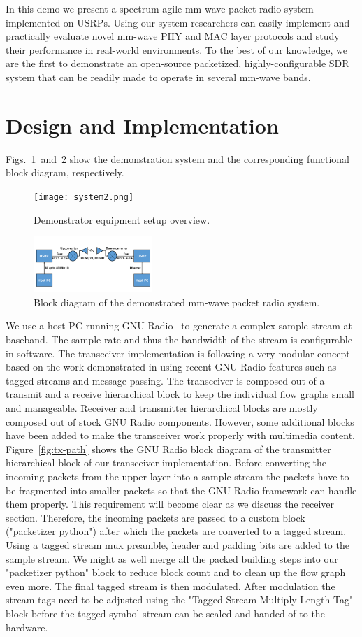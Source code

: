 \documentclass{sig-alternate}
\begin{document}
In this demo we present a spectrum-agile mm-wave packet radio system implemented on USRPs. Using our system researchers can easily implement and practically evaluate novel mm-wave PHY and MAC layer protocols and study their performance in real-world environments. To the best of our knowledge, we are the first to demonstrate an open-source packetized, highly-configurable SDR system that can be readily made to operate in several mm-wave bands.

\section{Design and Implementation}
Figs.~\ref{fig:system}~and~\ref{fig:block} show the demonstration system and the corresponding functional block diagram, respectively.
\begin{figure}[!tb]
\center
\texttt{[image: system2.png]}
\caption{Demonstrator equipment setup overview.}
\label{fig:system}
\end{figure}
\begin{figure}[!tb]
\center
\includegraphics[width=0.4\textwidth]{block-diagram}
\caption{Block diagram of the demonstrated mm-wave packet radio system.}
\label{fig:block}
\end{figure}
We use a host PC running GNU Radio~\cite{gnuradio} to generate a complex sample stream at baseband. The sample rate and thus the bandwidth of the stream is configurable in software.
The transceiver implementation is following a very modular concept based on the work demonstrated in \cite{Malsbury:phymac} using recent GNU Radio features such as tagged streams and message passing.
The transceiver is composed out of a transmit and a receive hierarchical block to keep the individual flow graphs small and manageable. 
Receiver and transmitter hierarchical blocks are mostly composed out of stock GNU Radio components. However, some additional blocks have been added to make the transceiver work properly with multimedia content.
Figure~\ref{fig:tx-path} shows the GNU Radio block diagram of the transmitter hierarchical block of our transceiver implementation.
Before converting the incoming packets from the upper layer into a sample stream the packets have to be fragmented into smaller packets so that the GNU Radio framework can handle them properly. This requirement will become clear as we discuss the receiver section. Therefore, the incoming packets are passed to a custom block ("packetizer python") after which the packets are converted to a tagged stream. Using a tagged stream mux preamble, header and padding bits are added to the sample stream. We might as well merge all the packed building steps into our "packetizer python" block to reduce block count and to clean up the flow graph even more. The final tagged stream is then modulated. After modulation the stream tags need to be adjusted using the "Tagged Stream Multiply Length Tag" block before the tagged symbol stream can be scaled and handed of to the hardware. 
\end{document}
